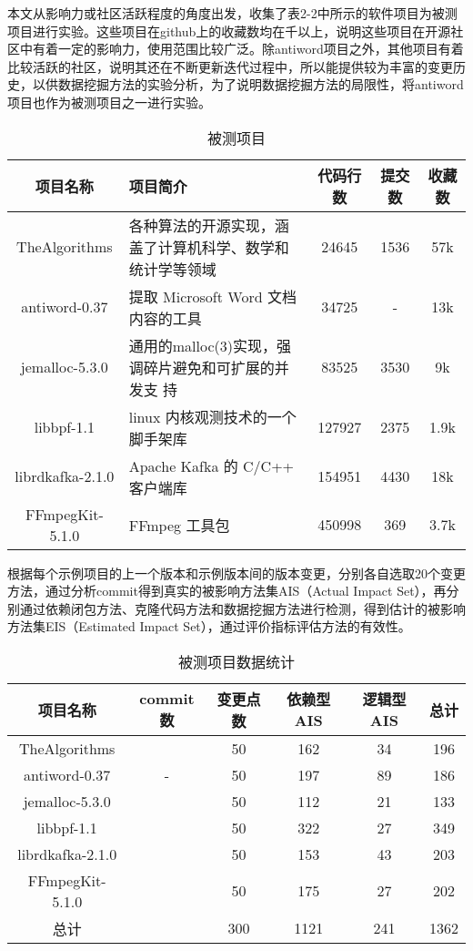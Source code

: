 本文从影响力或社区活跃程度的角度出发，收集了表2-2中所示的软件项目为被测项目进行实验。这些项目在github上的收藏数均在千以上，说明这些项目在开源社区中有着一定的影响力，使用范围比较广泛。除antiword项目之外，其他项目有着比较活跃的社区，说明其还在不断更新迭代过程中，所以能提供较为丰富的变更历史，以供数据挖掘方法的实验分析，为了说明数据挖掘方法的局限性，将antiword项目也作为被测项目之一进行实验。

\begin{table}[htbp]
\caption{被测项目}
\vspace{0.5em}\centering\wuhao
\begin{tabular}{cp{6cm}ccc}
\toprule
项目名称 & 项目简介 & 代码行数& 提交数 & 收藏数 \\
\midrule
TheAlgorithms & 各种算法的开源实现，涵盖了计算机科学、数学和统计学等领域 & 24645 & 1536 & 57k \\
antiword-0.37 & 提取 Microsoft Word 文档内容的工具 & 34725& - & 13k\\
jemalloc-5.3.0 & 通用的malloc(3)实现，强调碎片避免和可扩展的并发支
持  &83525& 3530 & 9k \\
libbpf-1.1 & linux 内核观测技术的一个脚手架库 & 127927 & 2375 & 1.9k \\
librdkafka-2.1.0& Apache Kafka 的 C/C++ 客户端库 & 154951 & 4430 & 18k \\
FFmpegKit-5.1.0 & FFmpeg 工具包 & 450998 & 369 & 3.7k \\

\bottomrule
\end{tabular}
\end{table}


根据每个示例项目的上一个版本和示例版本间的版本变更，分别各自选取20个变更方法，通过分析commit得到真实的被影响方法集AIS（Actual Impact Set），再分别通过依赖闭包方法、克隆代码方法和数据挖掘方法进行检测，得到估计的被影响方法集EIS（Estimated Impact Set），通过评价指标评估方法的有效性。

\begin{table}[htbp]
\caption{被测项目数据统计}
\vspace{0.5em}\centering\wuhao
\begin{tabular}{cccccc}
\toprule
项目名称 & commit数 & 变更点数 & 依赖型AIS & 逻辑型AIS & 总计 \\
\midrule
TheAlgorithms &  & 50 & 162 & 34 & 196\\
antiword-0.37 & - & 50 & 197 & 89 & 186 \\
jemalloc-5.3.0 &   & 50 & 112 & 21 & 133 \\
libbpf-1.1 &  & 50 & 322 & 27 & 349 \\
librdkafka-2.1.0 &  & 50 & 153 & 43 & 203\\
FFmpegKit-5.1.0 &  & 50 & 175 & 27 & 202\\
总计 &  & 300 & 1121 & 241 & 1362 \\
\bottomrule
\end{tabular}
\end{table}




